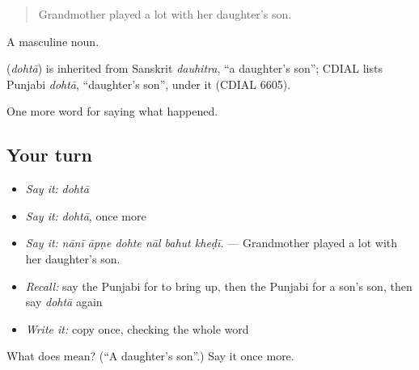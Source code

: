 \begin{quote}
Grandmother played a lot with her daughter's son.
\end{quote}

A masculine noun.

\begin{cousinweb}
\textbf{} (\emph{dohtā}) is inherited from Sanskrit \emph{dauhitra}, \textquotedblleft{}a daughter's son\textquotedblright{}; CDIAL lists Punjabi \emph{dohtā}, \textquotedblleft{}daughter's son\textquotedblright{}, under it (CDIAL 6605).
\end{cousinweb}

\begin{grammarlens}[title={What you've built}]
One more word for saying what happened.
\end{grammarlens}

\subsection*{Your turn}
\begin{itemize}
\raggedright
  \item \emph{Say it:} \emph{dohtā}
  \item \emph{Say it:} \emph{dohtā}, once more
  \item \emph{Say it:} \emph{nānī āpṇe dohte nāl bahut kheḍī.} — Grandmother played a lot with her daughter's son.
  \item \emph{Recall:} say the Punjabi for to bring up, then the Punjabi for a son's son, then say \emph{dohtā} again
  \item \emph{Write it:} copy \textbf{} once, checking the whole word
\end{itemize}

\begin{tcolorbox}[breakable,colback=teal!4,colframe=teal!35!black,title={Before you move on}]
What does  mean? (\textquotedblleft{}A daughter's son\textquotedblright{}.) Say it once more.
\end{tcolorbox}

